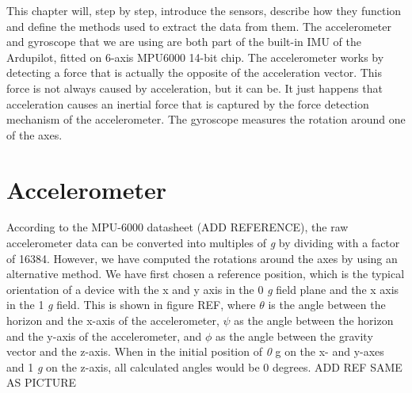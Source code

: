 This chapter will, step by step, introduce the sensors, describe how they function and define the methods used to extract the data from them. The accelerometer and gyroscope that we are using are both part of the built-in IMU of the Ardupilot, fitted on 6-axis MPU6000 14-bit chip. The accelerometer works by detecting a force that is actually the opposite of the acceleration vector. This force is not always caused by acceleration, but it can be. It just happens that acceleration causes an inertial force that is captured by the force detection mechanism of the accelerometer. The gyroscope measures the rotation around one of the axes.

\section{Accelerometer}
According to the MPU-6000 datasheet (ADD REFERENCE), the raw accelerometer data can be converted into multiples of \textit{g} by dividing with a factor of 16384. However, we have computed the rotations around the axes by using an alternative method. We have first chosen a reference position, which is the typical orientation of a device with the x and y axis in the 0 \textit{g} field plane and the x axis in the 1 \textit{g} field. This is shown in figure REF, where $\theta$ is the angle between the horizon and the x-axis of the accelerometer, $\psi$ as the angle between the horizon and the y-axis of the accelerometer, and
$\phi$ as the angle between the gravity vector and the z-axis. When in the initial position of \textit{0} g on the x- and y-axes and 1 \textit{g} on the z-axis, all calculated angles would be 0 degrees. ADD REF SAME AS PICTURE


